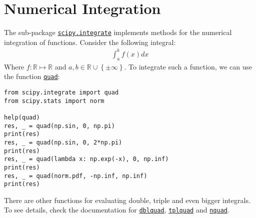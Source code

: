 \documentclass[12pt, a4paper]{article}
\newcommand{\Set}[1]{\left\{#1\right\}}
\begin{document}
\section{Numerical Integration}
\label{sec:org33f80c9}
The sub-package \href{https://docs.scipy.org/doc/scipy/reference/tutorial/integrate.html}{\texttt{scipy.integrate}} implements methods for the numerical integration of functions.
Consider the following integral:
\begin{align*}
\int_a^b f(x)dx
\end{align*}
Where \(f:\mathbb{R}\mapsto\mathbb{R}\) and \(a,b\in\mathbb{R}\cup\Set{\pm\infty}\).
To integrate such a function, we can use the function \href{https://docs.scipy.org/doc/scipy/reference/generated/scipy.integrate.quad.html\#scipy-integrate-quad}{\texttt{quad}}:
\lstset{language=jupyter-python,label= ,caption= ,captionpos=b,numbers=none}
\begin{lstlisting}
from scipy.integrate import quad
from scipy.stats import norm

help(quad)
res, _ = quad(np.sin, 0, np.pi)
print(res)
res, _ = quad(np.sin, 0, 2*np.pi)
print(res)
res, _ = quad(lambda x: np.exp(-x), 0, np.inf)
print(res)
res, _ = quad(norm.pdf, -np.inf, np.inf)
print(res)
\end{lstlisting}
There are other functions for evaluating double, triple and even bigger integrals.
To see details, check the documentation for \href{https://docs.scipy.org/doc/scipy/reference/generated/scipy.integrate.dblquad.html\#scipy-integrate-dblquad}{\texttt{dblquad}}, \href{https://docs.scipy.org/doc/scipy/reference/generated/scipy.integrate.tplquad.html\#scipy.integrate.tplquad}{\texttt{tplquad}} and \href{https://docs.scipy.org/doc/scipy/reference/generated/scipy.integrate.nquad.html\#scipy-integrate-nquad}{\texttt{nquad}}.
\end{document}
